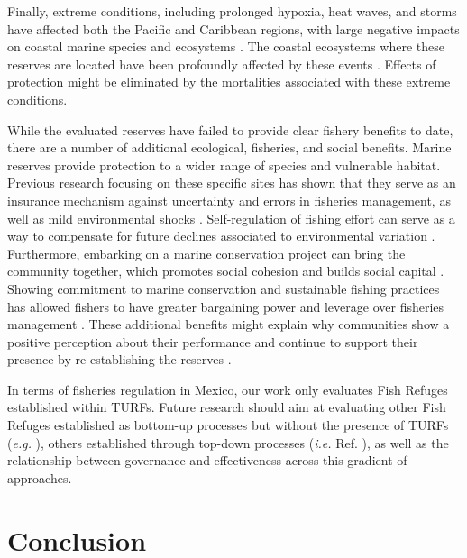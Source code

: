 \documentclass[10pt,letterpaper]{article}
\begin{document}
Finally, extreme conditions, including prolonged hypoxia, heat waves, and storms have affected both the Pacific and Caribbean regions, with large negative impacts on coastal marine species and ecosystems \cite{cavole_2016,hughes_2018,breitburg_2018}. The coastal ecosystems where these reserves are located have been profoundly affected by these events \cite{micheli_2012-EU,woodson_2018}. Effects of protection might be eliminated by the mortalities associated with these extreme conditions.

While the evaluated reserves have failed to provide clear fishery benefits to date, there are a number of additional ecological, fisheries, and social benefits. Marine reserves provide protection to a wider range of species and vulnerable habitat. Previous research focusing on these specific sites has shown that they serve as an insurance mechanism against uncertainty and errors in fisheries management, as well as mild environmental shocks \cite{micheli_2012-EU,deleo_2015,roberts_2017-J9,aalto}. Self-regulation of fishing effort can serve as a way to compensate for future declines associated to environmental variation \cite{finkbeiner_2018}. Furthermore, embarking on a marine conservation project can bring the community together, which promotes social cohesion and builds social capital \cite{fulton_2019}. Showing commitment to marine conservation and sustainable fishing practices has allowed fishers to have greater bargaining power and leverage over fisheries management \cite{prezramrez_2012}. These additional benefits might explain why communities show a positive perception about their performance and continue to support their presence by re-establishing the reserves \cite{ayer_2018,bennett_2019}.

In terms of fisheries regulation in Mexico, our work only evaluates Fish Refuges established within TURFs. Future research should aim at evaluating other Fish Refuges established as bottom-up processes but without the presence of TURFs (\emph{e.g.} \cite{dof_websiteC_2012}), others established through top-down processes (\emph{i.e.} Ref. \cite{dof_websiteU_2018}), as well as the relationship between governance and effectiveness across this gradient of approaches. 

\section*{Conclusion}
\end{document}
